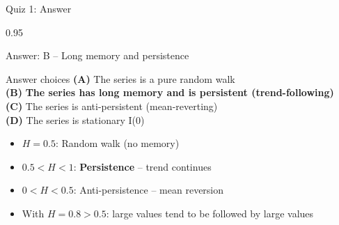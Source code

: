 \documentclass[9pt, aspectratio=169, t]{beamer}
\begin{document}
\begin{frame}{Quiz 1: Answer}
    \begin{cminipage}{0.95\textwidth}
    {\small
    \begin{exampleblock}{Answer: B -- Long memory and persistence}
    \begin{block}{Answer choices}
        \textcolor{MainBlue}{\textbf{(A)}} The series is a pure random walk \incorrect\\[2pt]
        \textcolor{MainBlue}{\textbf{(B)}} \textbf{\textcolor{Forest}{The series has long memory and is persistent (trend-following)}} \correct\\[2pt]
        \textcolor{MainBlue}{\textbf{(C)}} The series is anti-persistent (mean-reverting) \incorrect\\[2pt]
        \textcolor{MainBlue}{\textbf{(D)}} The series is stationary I(0) \incorrect
    \end{block}

        \vspace{0.1cm}

        \begin{itemize}\setlength{\itemsep}{0pt}
            \item $H = 0.5$: Random walk (no memory)
            \item $0.5 < H < 1$: \textbf{Persistence} -- trend continues
            \item $0 < H < 0.5$: Anti-persistence -- mean reversion
            \item With $H = 0.8 > 0.5$: large values tend to be followed by large values
        \end{itemize}
    \end{exampleblock}
    }
    \end{cminipage}
\end{frame}
\end{document}
